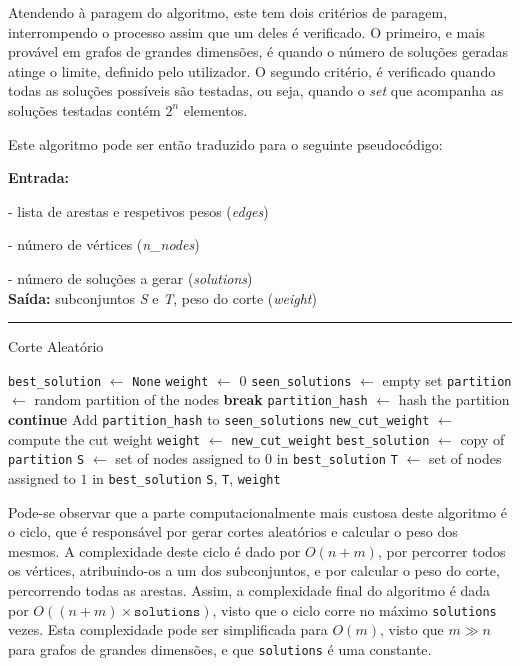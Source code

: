 \documentclass[mirror, portugues]{revdetua}
\begin{document}
Atendendo à paragem do algoritmo, este tem dois critérios de paragem, interrompendo o processo assim que um deles é verificado. O primeiro, e mais provável em grafos de grandes dimensões, é quando o número de soluções geradas atinge o limite, definido pelo utilizador. O segundo critério, é verificado quando todas as soluções possíveis são testadas, ou seja, quando o \textit{set} que acompanha as soluções testadas contém $2^n$ elementos.

Este algoritmo pode ser então traduzido para o seguinte pseudocódigo:

\begin{algorithm}[H]
\raggedright
\textbf{Entrada:}

- lista de arestas e respetivos pesos (\textit{edges})

- número de vértices (\textit{n\_nodes})

- número de soluções a gerar (\textit{solutions})\\
\textbf{Saída:} subconjuntos \textit{S} e \textit{T}, peso do corte (\textit{weight}) \\
\hrule 
\caption{Corte Aleatório}
\begin{algorithmic}[1]
    \State \texttt{best\_solution} $\gets$ \texttt{None}
    \State \texttt{weight} $\gets$ 0
    \State \texttt{seen\_solutions} $\gets$ empty set
        \State \texttt{partition} $\gets$ random partition of the nodes
            \State \textbf{break}
        \EndIf
        \State \texttt{partition\_hash} $\gets$ hash the partition
            \State \textbf{continue}
        \EndIf
        \State Add \texttt{partition\_hash} to \texttt{seen\_solutions}
        \State \texttt{new\_cut\_weight} $\gets$ compute the cut weight
            \State \texttt{weight} $\gets$ \texttt{new\_cut\_weight}
            \State \texttt{best\_solution} $\gets$ copy of \texttt{partition}
        \EndIf
    \EndFor
    \State \texttt{S} $\gets$ set of nodes assigned to $0$ in \texttt{best\_solution}
    \State \texttt{T} $\gets$ set of nodes assigned to $1$ in \texttt{best\_solution}
    \Return \texttt{S}, \texttt{T}, \texttt{weight}
\end{algorithmic}
\end{algorithm}
    
Pode-se observar que a parte computacionalmente mais custosa deste algoritmo é o ciclo, que é responsável por gerar cortes aleatórios e calcular o peso dos mesmos. A complexidade deste ciclo é dado por $O(n + m)$, por percorrer todos os vértices, atribuindo-os a um dos subconjuntos, e por calcular o peso do corte, percorrendo todas as arestas. Assim, a complexidade final do algoritmo é dada por $O((n + m) \times \texttt{solutions})$, visto que o ciclo corre no máximo \texttt{solutions} vezes. Esta complexidade pode ser simplificada para $O(m)$, visto que $m \gg n$ para grafos de grandes dimensões, e que \texttt{solutions} é uma constante.
\end{document}
